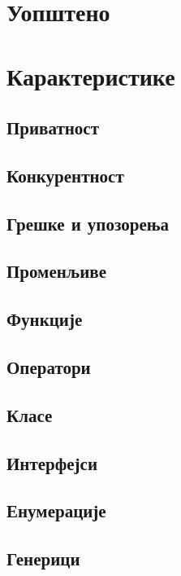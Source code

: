 \documentclass[12pt,oneside]{memoir}
\begin{document}
\section{Уопштено}

\section{Карактеристике}

\subsection{Приватност}

\subsection{Конкурентност}

\subsection{Грешке и упозорења}

\subsection{Променљиве}

\subsection{Функције}

\subsection{Оператори}

\subsection{Класе}

\subsection{Интерфејси}

\subsection{Енумерације}

\subsection{Генерици}
\end{document}

